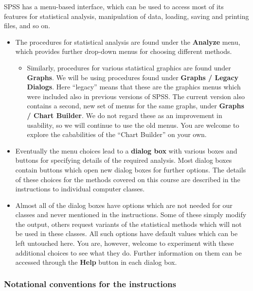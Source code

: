 \documentclass[11pt,a4paper,openany]{book}
\providecommand{\tightlist}{%
  \setlength{\itemsep}{0pt}\setlength{\parskip}{0pt}}
\begin{document}
SPSS has a menu-based interface, which can be used to access most of its
features for statistical analysis, manipulation of data, loading, saving
and printing files, and so on.

\begin{itemize}
\item
  The procedures for statistical analysis are found under the
  \textbf{Analyze} menu, which provides further drop-down menus for
  choosing different methods.

  \begin{itemize}
  \tightlist
  \item
    Similarly, procedures for various statistical graphics are found
    under \textbf{Graphs}. We will be using procedures found under
    \textbf{Graphs / Legacy Dialogs}. Here ``legacy'' means that these
    are the graphics menus which were included also in previous versions
    of SPSS. The current version also contains a second, new set of
    menus for the same graphs, under \textbf{Graphs / Chart Builder}. We
    do not regard these as an improvement in usability, so we will
    continue to use the old menus. You are welcome to explore the
    cababilities of the ``Chart Builder'' on your own.
  \end{itemize}
\item
  Eventually the menu choices lead to a \textbf{dialog box} with various
  boxes and buttons for specifying details of the required analysis.
  Most dialog boxes contain buttons which open new dialog boxes for
  further options. The details of these choices for the methods covered
  on this course are described in the instructions to individual
  computer classes.
\item
  Almost all of the dialog boxes have options which are not needed for
  our classes and never mentioned in the instructions. Some of these
  simply modify the output, others request variants of the statistical
  methods which will not be used in these classes. All such options have
  default values which can be left untouched here. You are, however,
  welcome to experiment with these additional choices to see what they
  do. Further information on them can be accessed through the
  \textbf{Help} button in each dialog box.
\end{itemize}

\subsubsection*{Notational conventions for the
instructions}\label{notational-conventions-for-the-instructions}
\end{document}
